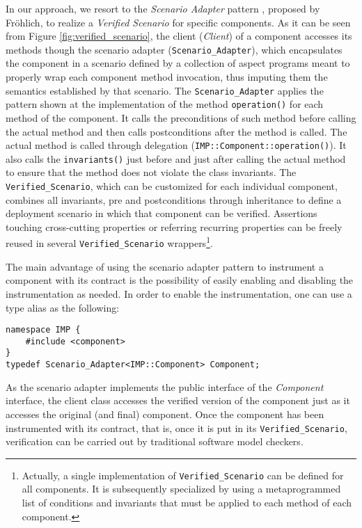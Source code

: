 \documentclass{sig-alternate}
\begin{document}
In our approach, we resort to the \emph{Scenario Adapter} pattern
\cite{Frohlich:SCI:2000}, proposed by Fröhlich, to realize a
\emph{Verified Scenario} for specific components. As it can be seen from
Figure \ref{fig:verified_scenario}, the client (\emph{Client}) of a
component accesses its methods though the scenario adapter
(\texttt{Scenario\_Adapter}), which encapsulates the component in a
scenario defined by a collection of aspect programs meant to properly
wrap each component method invocation, thus imputing them the semantics
established by that scenario. The \texttt{Scenario\_Adapter} applies the
pattern shown at the implementation of the method \texttt{operation()}
for each method of the component. It calls the preconditions of such
method before calling the actual method and then calls postconditions
after the method is called.  The actual method is called through
delegation (\texttt{IMP\-::\-Com\-ponent::operation()}).  It also calls
the \texttt{invariants()} just before and just after calling the actual
method to ensure that the method does not violate the class invariants.
The \texttt{Verified\_Scenario}, which can be customized for each
individual component, combines all invariants, pre and postconditions
through inheritance to define a deployment scenario in which that
component can be verified. Assertions touching cross-cutting properties
or referring recurring properties can be freely reused in several
\texttt{Verified\_Scenario} wrappers\footnote{Actually, a single
  implementation of \texttt{Verified\_Scenario} can be defined for all
  components. It is subsequently specialized by using a metaprogrammed
  list of conditions and invariants that must be applied to each method
  of each component.}.

The main advantage of using the scenario adapter pattern to instrument a
component with its contract is the possibility of easily enabling and
disabling the instrumentation as needed.  In order to enable the
instrumentation, one can use a type alias as the following:
\begin{verbatim}
namespace IMP {
    #include <component>
}
typedef Scenario_Adapter<IMP::Component> Component;
\end{verbatim}
As the scenario adapter implements the public interface of the
\emph{Component} interface, the client class accesses the verified
version of the component just as it accesses the original (and final)
component. Once the component has been instrumented with its contract,
that is, once it is put in its \texttt{Verified\_Scenario}, verification
can be carried out by traditional software model checkers.
\end{document}
